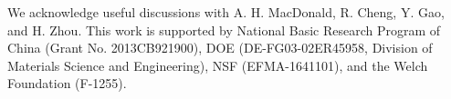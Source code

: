 \documentclass[aps,prb,twocolumn,showpacs,superscriptaddress]{revtex4-1}
\begin{document}

We acknowledge useful discussions with A. H. MacDonald, R. Cheng, Y. Gao, and H. Zhou. This work is supported by National Basic Research Program of China (Grant No. 2013CB921900), DOE (DE-FG03-02ER45958, Division of Materials Science and Engineering), NSF (EFMA-1641101), and the Welch Foundation (F-1255). 

    
\balance

\end{document}

